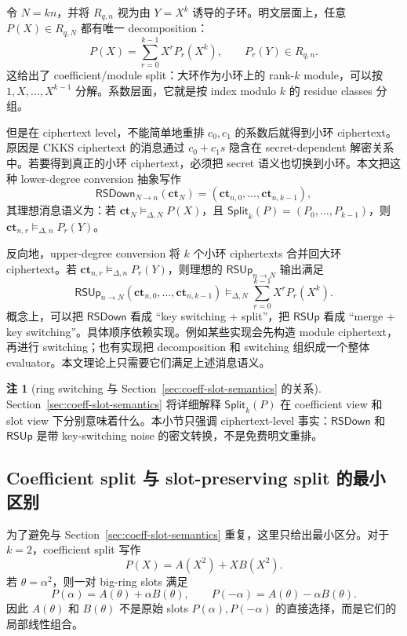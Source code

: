 \documentclass[UTF8,11pt]{article}
\newcommand{\Split}{\mathsf{Split}}
\newcommand{\RSDown}{\mathsf{RSDown}}
\newcommand{\RSUp}{\mathsf{RSUp}}
\newcommand{\ct}{\mathbf{ct}}
\theoremstyle{definition}
\newtheorem{remark}{注}
\theoremstyle{plain}
\begin{document}
令 \(N=kn\)，并将 \(R_{q,n}\) 视为由 \(Y=X^k\) 诱导的子环。明文层面上，任意 \(P(X)\in R_{q,N}\) 都有唯一 decomposition：
\[
P(X)=\sum_{r=0}^{k-1}X^rP_r(X^k),
\qquad P_r(Y)\in R_{q,n}.
\]
这给出了 coefficient/module split：大环作为小环上的 rank-\(k\) module，可以按 \(1,X,\ldots,X^{k-1}\) 分解。系数层面，它就是按 index modulo \(k\) 的 residue classes 分组。

但是在 ciphertext level，不能简单地重排 \(c_0,c_1\) 的系数后就得到小环 ciphertext。原因是 CKKS ciphertext 的消息通过 \(c_0+c_1s\) 隐含在 secret-dependent 解密关系中。若要得到真正的小环 ciphertext，必须把 secret 语义也切换到小环。本文把这种 lower-degree conversion 抽象写作
\[
\RSDown_{N\to n}(\ct_N)
=
(\ct_{n,0},\ldots,\ct_{n,k-1}),
\]
其理想消息语义为：若 \(\ct_N\vDash_{\Delta,N}P(X)\)，且 \(\Split_k(P)=(P_0,\ldots,P_{k-1})\)，则 \(\ct_{n,r}\vDash_{\Delta,n}P_r(Y)\)。

反向地，upper-degree conversion 将 \(k\) 个小环 ciphertexts 合并回大环 ciphertext。若 \(\ct_{n,r}\vDash_{\Delta,n}P_r(Y)\)，则理想的 \(\RSUp_{n\to N}\) 输出满足
\[
\RSUp_{n\to N}(\ct_{n,0},\ldots,\ct_{n,k-1})
\vDash_{\Delta,N}
\sum_{r=0}^{k-1}X^rP_r(X^k).
\]
概念上，可以把 \(\RSDown\) 看成 “key switching + split”，把 \(\RSUp\) 看成 “merge + key switching”。具体顺序依赖实现。例如某些实现会先构造 module ciphertext，再进行 switching；也有实现把 decomposition 和 switching 组织成一个整体 evaluator。本文理论上只需要它们满足上述消息语义。

\begin{remark}[ring switching 与 Section~\ref{sec:coeff-slot-semantics} 的关系]
Section~\ref{sec:coeff-slot-semantics} 将详细解释 \(\Split_k(P)\) 在 coefficient view 和 slot view 下分别意味着什么。本小节只强调 ciphertext-level 事实：\(\RSDown\) 和 \(\RSUp\) 是带 key-switching noise 的密文转换，不是免费明文重排。
\end{remark}

\subsection{Coefficient split 与 slot-preserving split 的最小区别}
\label{subsec:minimal-coeff-vs-slot}

为了避免与 Section~\ref{sec:coeff-slot-semantics} 重复，这里只给出最小区分。对于 \(k=2\)，coefficient split 写作
\[
P(X)=A(X^2)+XB(X^2).
\]
若 \(\theta=\alpha^2\)，则一对 big-ring slots 满足
\[
P(\alpha)=A(\theta)+\alpha B(\theta),
\qquad
P(-\alpha)=A(\theta)-\alpha B(\theta).
\]
因此 \(A(\theta)\) 和 \(B(\theta)\) 不是原始 slots \(P(\alpha),P(-\alpha)\) 的直接选择，而是它们的局部线性组合。
\end{document}
